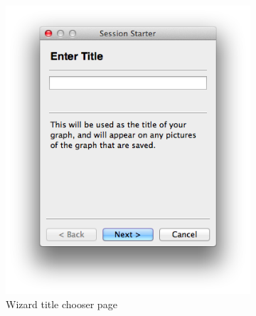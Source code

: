 \begin{figure}[h!]
    \centering
    \begin{subfigure}[b]{0.24\textwidth}
        \centering
        \includegraphics[width=\textwidth]{images/wizard_page_1.png}
        \caption{Wizard title chooser page}
        \label{fig:page_1}
    \end{subfigure}
    \begin{subfigure}[b]{0.24\textwidth}
        \centering

\end{subfigure}
\end{figure}
